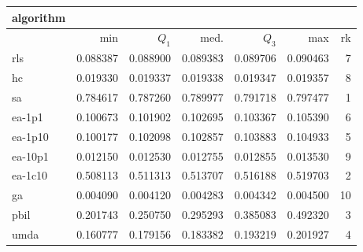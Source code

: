 \begin{tabular}{@{}l*{5}{>{{}}N{1}{3}}>{{}}N{2}{0}@{}}
\toprule
{algorithm} &  \\
\midrule
& {min} & {$Q_1$} & {med.} & {$Q_3$} & {max} & {rk}\\
\midrule
rls & 0.088387 & 0.088900 & 0.089383 & 0.089706 & 0.090463 & 7\\
hc & 0.019330 & 0.019337 & 0.019338 & 0.019347 & 0.019357 & 8\\
sa & {\color{blue}} 0.784617 & {\color{blue}} 0.787260 & {\color{blue}} 0.789977 & {\color{blue}} 0.791718 & {\color{blue}} 0.797477 & 1\\
ea-1p1 & 0.100673 & 0.101902 & 0.102695 & 0.103367 & 0.105390 & 6\\
ea-1p10 & 0.100177 & 0.102098 & 0.102857 & 0.103883 & 0.104933 & 5\\
ea-10p1 & 0.012150 & 0.012530 & 0.012755 & 0.012855 & 0.013530 & 9\\
ea-1c10 & 0.508113 & 0.511313 & 0.513707 & 0.516188 & 0.519703 & 2\\
ga & 0.004090 & 0.004120 & 0.004283 & 0.004342 & 0.004500 & 10\\
pbil & 0.201743 & 0.250750 & 0.295293 & 0.385083 & 0.492320 & 3\\
umda & 0.160777 & 0.179156 & 0.183382 & 0.193219 & 0.201927 & 4\\
\bottomrule
\end{tabular}
